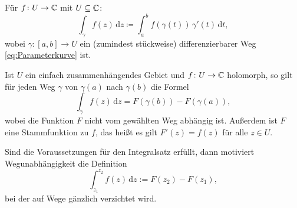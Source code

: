 \begin{definition}[Kurvenintegral]\mbox{}\newline
Für $f\colon U\to\mathbb C$ mit $U\subseteq\mathbb C$:%
\begin{equation}
\int_\gamma f(z)\,\mathrm dz
\coloneq\int_a^b f(\gamma(t))\,\gamma'(t)\,\mathrm dt,
\end{equation}
wobei $\gamma\colon [a,b]\to U$ ein (zumindest stückweise)
differenzierbarer Weg \eqref{eq:Parameterkurve} ist.
\end{definition}

\noindent
{}
Ist $U$ ein einfach zusammenhängendes Gebiet und $f\colon U\to\mathbb C$
holomorph, so gilt für jeden Weg $\gamma$ von $\gamma(a)$ nach
$\gamma(b)$ die Formel%
\begin{equation}
\int_\gamma f(z)\,\mathrm dz = F(\gamma(b))-F(\gamma(a)),
\end{equation}
wobei die Funktion $F$ nicht vom gewählten Weg abhängig ist.
Außerdem ist $F$ eine Stammfunktion zu $f$, das heißt es gilt
$F'(z)=f(z)$ für alle $z\in U$.

Sind die Voraussetzungen für den Integralsatz erfüllt,
dann motiviert Wegunabhängigkeit die Definition%
\begin{equation}
\int_{z_1}^{z_2} f(z)\,\mathrm dz := F(z_2)-F(z_1),
\end{equation}
bei der auf Wege gänzlich verzichtet wird.

